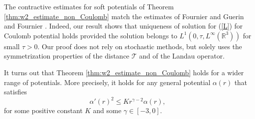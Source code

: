 \documentclass[11pt]{amsart}
\numberwithin{equation}{section}
\begin{document}
The contractive estimates for soft potentials of Theorem \ref{thm:w2_estimate_non_Coulomb}  match the  estimates of Fournier and Guerin  \cite{fournier2009well_posedness_soft_potentials} and Fournier \cite{fournier2010uniqueness_Coulomb}. Indeed, our result shows that uniqueness of solution for (\ref{L}) for Coulomb potential holds provided the solution belongs to $L^1(0,\tau,L^\infty(\mathbb{R}^3))$ for small $\tau>0$. Our proof does not rely on stochastic methods, but solely uses the symmetrization properties of the distance $\mathcal{T}$ and of the Landau operator.  

It turns out that Theorem \ref{thm:w2_estimate_non_Coulomb} holds for a wider range of potentials. More precisely, it holds for any general  potential  $\alpha(r) $ that satisfies %
$$
\alpha'(r)^2\leq Kr^{\gamma-2}\alpha(r),  %
$$
for some positive constant $K$ and some $\gamma \in [-3,0]$. 





\end{document}
